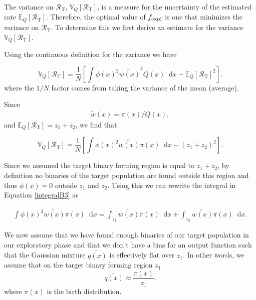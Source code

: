 \documentclass[a4paper,fleqn,usenatbib,useAMS,usedcolumn]{mnras}
\newcommand\rate{\mathcal{R}}
\newcommand{\NEhits}{$N_{\text{T,expl}}$ }
\newcommand*\dif{\mathop{}\!\mathrm{d}}
\begin{document}
The variance on $\rate_{\text{T}}$, $\mathbb{V}_Q[\rate_{\text{T}}]$, is a measure for the uncertainty of the estimated rate  ${\mathbb{E}_Q[\rate_{\text{T}}]}$. Therefore, the optimal value of  $f_{\rm{expl}}$ is one that minimizes the variance on $\rate_{\text{T}}$. To determine this we first derive an estimate for the variance  $\mathbb{V}_Q[\rate_{\text{T}}]$. 


Using the continuous definition for the variance we have

\begin{equation}
	\mathbb{V}_Q[\rate_{\text{T}}] = \frac{1}{N} \left[ \int \phi(x)^2 \widetilde{w(x)}^2 Q(x) \dif x - \mathbb{E}_Q[\rate_{\text{T}}]^2  \right].
\end{equation}
where the $1/N$ factor comes from  taking the variance of the mean (average). 

Since
\begin{align}
\widetilde{w}(x) = \pi(x) / Q(x), 
\end{align}   
and  $\mathbb{E}_Q[\rate_{\text{T}}] = z_1 + z_2$, we find that

\begin{equation}
	\mathbb{V}_Q[\rate_{\text{T}}] = \frac{1}{N} \left[ \int \phi(x)^2 \widetilde{w(x)} \pi(x) \dif x - (z_1 + z_2)^2  \right].
	\label{integralB3}
\end{equation}

Since we assumed the target binary forming region is equal to $z_1 + z_2$, by definition no binaries of the target population are found outside this region and thus $\phi(x) = 0 $ outside $z_1 $ and $z_2$. Using this we can rewrite the integral in Equation \ref{integralB3} as

\begin{align}
	 \int \phi(x)^2 \widetilde{w(x)} \pi(x) \dif x  =
	  \int_{z_1}  \widetilde{w(x)} \pi(x) \dif x + \int_{z_2}  \widetilde{w(x)} \pi(x) \dif x.
	  \label{integralB4}
\end{align}

We now assume that we have found enough binaries of our target population  in our exploratory phase and that we don't have a bias for an output function such that the Gaussian mixture $\widetilde{q(x)}$ is effectively flat over $z_1$. In other words, we assume that on the target binary forming region $z_1$  
%
\begin{equation}
	\widetilde{q(x)}   \approx  \frac{\pi(x)}{z_1}.	 %
\end{equation} 
%
where $\pi(x)$ is the birth distribution. 
\end{document}
